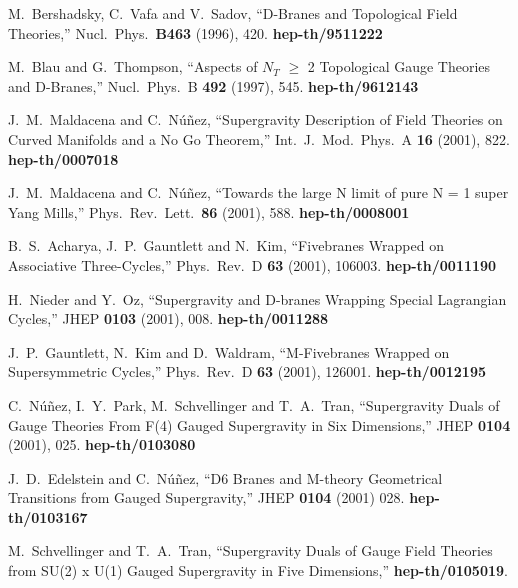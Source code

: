 \documentclass[12pt,a4paper]{article}
\begin{document}
\begin{thebibliography}{99}

\renewcommand{\baselinestretch}{1}
\normalsize

 M.~Bershadsky, C.~Vafa and V.~Sadov,
``D-Branes and Topological Field Theories,''
Nucl.\ Phys.\ {\bf B463} (1996), 420. {\bf hep-th/9511222}

 M.~Blau and G.~Thompson,
``Aspects of $N_T$ $\geq$ 2 Topological Gauge Theories and D-Branes,''
Nucl.\ Phys.\ B {\bf 492} (1997), 545. {\bf hep-th/9612143}

 J.~M.~Maldacena and C.~N\'u\~nez,
``Supergravity Description of Field Theories on Curved Manifolds and a No Go Theorem,''
Int.\ J.\ Mod.\ Phys.\ A {\bf 16} (2001), 822. {\bf hep-th/0007018}

 J.~M.~Maldacena and C.~N\'u\~nez,
``Towards the large N limit of pure N = 1 super Yang Mills,''
Phys.\ Rev.\ Lett.\ {\bf 86} (2001), 588. {\bf hep-th/0008001}

 B.~S.~Acharya, J.~P.~Gauntlett and N.~Kim,
``Fivebranes Wrapped on Associative Three-Cycles,''
Phys.\ Rev.\ D {\bf 63} (2001), 106003. {\bf hep-th/0011190}

 H.~Nieder and Y.~Oz,
``Supergravity and D-branes Wrapping Special Lagrangian Cycles,''
JHEP {\bf 0103} (2001), 008. {\bf hep-th/0011288}

 J.~P.~Gauntlett, N.~Kim and D.~Waldram,
``M-Fivebranes Wrapped on Supersymmetric Cycles,''
Phys.\ Rev.\ D {\bf 63} (2001), 126001. {\bf hep-th/0012195}

 C.~N\'u\~nez, I.~Y.~Park, M.~Schvellinger and T.~A.~Tran,
``Supergravity Duals of Gauge Theories From F(4) Gauged Supergravity in Six Dimensions,''
JHEP {\bf 0104} (2001), 025. {\bf hep-th/0103080}

 J.~D.~Edelstein and C.~N\'u\~nez,
``D6 Branes and M-theory Geometrical Transitions from Gauged Supergravity,''
JHEP {\bf 0104} (2001) 028. {\bf hep-th/0103167}

 M.~Schvellinger and T.~A.~Tran,
``Supergravity Duals of Gauge Field Theories from SU(2) x U(1) Gauged Supergravity in Five Dimensions,''
{\bf hep-th/0105019}.


\end{thebibliography}
\end{document}
